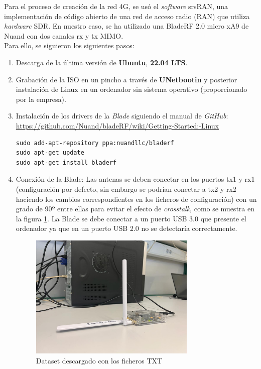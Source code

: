 Para el proceso de creación de la red 4G, se usó el \textit{software} srsRAN, una implementación de código abierto de una red de acceso radio (RAN) que utiliza \textit{hardware} SDR. En nuestro caso, se ha utilizado una BladeRF 2.0 micro xA9 de Nuand con dos canales rx y tx MIMO.\\

Para ello, se siguieron los siguientes pasos:

\begin{enumerate}
\item Descarga de la última versión de \textbf{Ubuntu}, \textbf{22.04 LTS}.
\item Grabación de la ISO en un pincho a través de \textbf{UNetbootin} y posterior instalación de Linux en un ordenador sin sistema operativo (proporcionado por la empresa).
\item Instalación de los drivers de la \textit{Blade} siguiendo el manual de \textit{GitHub}:\\
 \url{https://github.com/Nuand/bladeRF/wiki/Getting-Started:-Linux}

\begin{lstlisting}
sudo add-apt-repository ppa:nuandllc/bladerf
sudo apt-get update
sudo apt-get install bladerf
\end{lstlisting}

\item Conexión de la Blade: Las antenas se deben conectar en los puertos tx1 y rx1 (configuración por defecto, sin embargo se podrían conectar a tx2 y rx2 haciendo los cambios correspondientes en los ficheros de configuración) con un grado de 90º entre ellas para evitar el efecto de \textit{crosstalk}, como se muestra en la figura \ref{blade}. La Blade se debe conectar a un puerto USB 3.0 que presente el ordenador ya que en un puerto USB 2.0 no se detectaría correctamente.\\

\begin{figure}[H]
	\centering
	\includegraphics[width=0.75\textwidth]{Imagenes/AnexoI_Manual/RED/blade.jpeg}
	\caption{Dataset descargado con los ficheros TXT}
	\label{blade}
\end{figure}


\end{enumerate}
